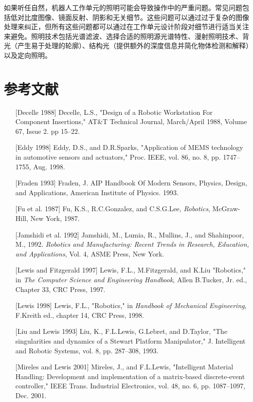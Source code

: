 \documentclass[UTF8,a4paper]{ctexart}
\begin{document}
如果听任自然，机器人工作单元的照明可能会导致操作中的严重问题。常见问题包括低对比度图像、镜面反射、阴影和无关细节。这些问题可以通过过于复杂的图像处理来纠正，但所有这些问题都可以通过在工作单元设计阶段对细节进行适当关注来避免。照明技术包括光谱滤波、选择合适的照明源光谱特性、漫射照明技术、背光（产生易于处理的轮廓）、结构光（提供额外的深度信息并简化物体检测和解释）以及定向照明。

\section*{参考文献}

\begin{enumerate}
    \item[{[Decelle 1988]}] Decelle, L.S., "Design of a Robotic Workstation For Component Insertions," AT\&T Technical Journal, March/April 1988, Volume 67, Issue 2. pp 15–22.
    \item[{[Eddy 1998]}] Eddy, D.S., and D.R.Sparks, "Application of MEMS technology in automotive sensors and actuators," Proc. IEEE, vol. 86, no. 8, pp. 1747–1755, Aug. 1998.
    \item[{[Fraden 1993]}] Fraden, J. AIP Handbook Of Modern Sensors, Physics, Design, and Applications, American Institute of Physics. 1993.
    \item[{[Fu et al. 1987]}] Fu, K.S., R.C.Gonzalez, and C.S.G.Lee, \textit{Robotics}, McGraw-Hill, New York, 1987.
    \item[{[Jamshidi et al. 1992]}] Jamshidi, M., Lumia, R., Mullins, J., and Shahinpoor, M., 1992. \textit{Robotics and Manufacturing: Recent Trends in Research, Education, and Applications}, Vol. 4, ASME Press, New York.
    \item[{[Lewis and Fitzgerald 1997]}] Lewis, F.L., M.Fitzgerald, and K.Liu "Robotics," in \textit{The Computer Science and Engineering Handbook}, Allen B.Tucker, Jr. ed., Chapter 33, CRC Press, 1997.
    \item[{[Lewis 1998]}] Lewis, F.L., "Robotics," in \textit{Handbook of Mechanical Engineering}, F.Kreith ed., chapter 14, CRC Press, 1998.
    \item[{[Liu and Lewis 1993]}] Liu, K., F.L.Lewis, G.Lebret, and D.Taylor, "The singularities and dynamics of a Stewart Platform Manipulator," J. Intelligent and Robotic Systems, vol. 8, pp. 287–308, 1993.
    \item[{[Mireles and Lewis 2001]}] Mireles, J., and F.L.Lewis, "Intelligent Material Handling: Development and implementation of a matrix-based discrete-event controller," IEEE Trans. Industrial Electronics, vol. 48, no. 6, pp. 1087–1097, Dec. 2001.

\end{enumerate}
\end{document}
